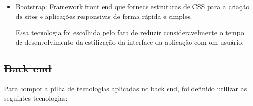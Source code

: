 \documentclass[
    12pt,               %
    openright,          %
    oneside,
    a4paper,            %
    BIBLATEX,           %
    TODO,               %
    english,            %
    brazil              %
    ]{ifsp-spo-inf-ctds}
\providecommand{\DIFadd}[1]{{\protect\color{blue}\uwave{#1}}} %
\providecommand{\DIFdel}[1]{{\protect\color{red}\sout{#1}}}                      %
\providecommand{\DIFaddbegin}{} %
\providecommand{\DIFaddend}{} %
\providecommand{\DIFdelbegin}{} %
\providecommand{\DIFdelend}{} %
\newcommand{\DIFscaledelfig}{0.5}
\newlength{\DIFdelgraphicswidth} %
\newlength{\DIFdelgraphicsheight} %
\newcommand{\DIFaddincludegraphics}[2][]{{\color{blue}\fbox{\DIFOincludegraphics[#1]{#2}}}} %
\newcommand{\DIFdelincludegraphics}[2][]{%
\sbox{\DIFdelgraphicsbox}{\DIFOincludegraphics[#1]{#2}}%
\settoboxwidth{\DIFdelgraphicswidth}{\DIFdelgraphicsbox} %
\settoboxtotalheight{\DIFdelgraphicsheight}{\DIFdelgraphicsbox} %
\scalebox{\DIFscaledelfig}{%
\parbox[b]{\DIFdelgraphicswidth}{\usebox{\DIFdelgraphicsbox}\\[-\baselineskip] \rule{\DIFdelgraphicswidth}{0em}}\llap{\resizebox{\DIFdelgraphicswidth}{\DIFdelgraphicsheight}{%
\setlength{\unitlength}{\DIFdelgraphicswidth}%
\begin{picture}(1,1)%
\thicklines\linethickness{2pt} %
{\color[rgb]{1,0,0}\put(0,0){\framebox(1,1){}}}%
{\color[rgb]{1,0,0}\put(0,0){\line( 1,1){1}}}%
{\color[rgb]{1,0,0}\put(0,1){\line(1,-1){1}}}%
\end{picture}%
}\hspace*{3pt}}} %
} %
\DeclareRobustCommand{\DIFaddbegin}{\DIFOaddbegin \let\includegraphics\DIFaddincludegraphics} %
\DeclareRobustCommand{\DIFaddend}{\DIFOaddend \let\includegraphics\DIFOincludegraphics} %
\DeclareRobustCommand{\DIFdelbegin}{\DIFOdelbegin \let\includegraphics\DIFdelincludegraphics} %
\DeclareRobustCommand{\DIFdelend}{\DIFOaddend \let\includegraphics\DIFOincludegraphics} %
\begin{document}
\begin{itemize}
            \item Bootstrap:
                Framework front end que fornece estruturas de CSS para a criação de sites e aplicações responsivas de forma rápida e simples.

                Essa tecnologia foi escolhida pelo fato de reduzir consideravelmente o tempo de desenvolvimento da estilização da interface da aplicação com om usuário.

        \end{itemize}

        \subsection{\DIFdelbegin \DIFdel{Back end}\DIFdelend \DIFaddbegin \DIFadd{Back-end}\DIFaddend }

            Para compor a pilha de tecnologias aplicadas no back end, foi definido utilizar as seguintes tecnologias:
\end{document}
